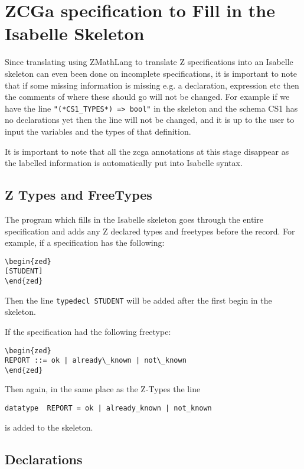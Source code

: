 \section{ZCGa specification to Fill in the Isabelle Skeleton}
\label{sec:zcga2fillin}

Since translating using ZMathLang to translate Z specifications into an Isabelle
skeleton can even been done on incomplete specifications, it is important to
note that if some missing information is missing e.g. a declaration, expression
etc then the comments of where these should go will not be changed. For example
if we have the line \verb|"(*CS1_TYPES*) => bool"| in the skeleton and the
schema CS1 has no declarations yet then the line will not be changed, and it is
up to the user to input the variables and the types of that definition.

It is important to note that all the \gls{zcga} annotations at this stage
disappear as the labelled information is automatically put into Isabelle syntax.

\subsection{Z Types and FreeTypes}

The program which fills in the Isabelle skeleton goes through the entire
specification and adds any Z declared types and freetypes before the record. For
example, if a specification has the following:
\begin{verbatim}
\begin{zed}
[STUDENT]
\end{zed}
\end{verbatim}

Then the line \verb|typedecl STUDENT| will be added after the first begin in the
skeleton.

If the specification had the following freetype:
\begin{verbatim}
\begin{zed} 
REPORT ::= ok | already\_known | not\_known
\end{zed}
\end{verbatim}

Then again, in the same place as the Z-Types the line
\begin{verbatim}
datatype  REPORT = ok | already_known | not_known
\end{verbatim}
is added to the skeleton.

\subsection{Declarations}


